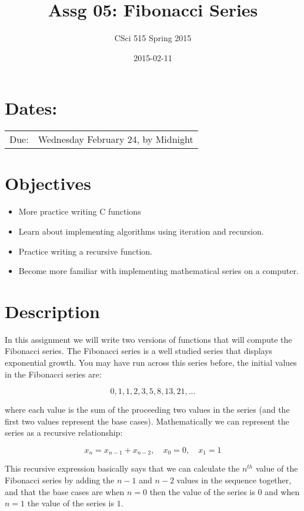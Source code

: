 \documentclass[11pt]{article}
\title{Assg 05: Fibonacci Series}
\author{CSci 515 Spring 2015}
\date{2015-02-11}
\begin{document}
\maketitle


\section*{Dates:}
\label{sec-1}


\begin{center}
\begin{tabular}{ll}
 Due:  &  Wednesday February 24, by Midnight  \\
\end{tabular}
\end{center}
\section*{Objectives}
\label{sec-2}

\begin{itemize}
\item More practice writing C functions
\item Learn about implementing algorithms using iteration and recursion.
\item Practice writing a recursive function.
\item Become more familiar with implementing mathematical series on a computer.
\end{itemize}
\section*{Description}
\label{sec-3}

In this assignment we will write two versions of functions that will
compute the Fibonacci series.  The Fibonacci series is a well studied
series that displays exponential growth.  You may have run across this
series before, the initial values in the Fibonacci series are:

$$
0, 1, 1, 2, 3, 5, 8, 13, 21, ...
$$

where each value is the sum of the proceeding two values in the series
(and the first two values represent the base cases).  Mathematically
we can represent the series as a recursive relationship:

$$
x_n = x_{n-1} + x_{n-2}, \quad x_0 = 0, \quad x_1 = 1
$$

This recursive expression basically says that we can calculate the
$n^{th}$ value of the Fibonacci series by adding the $n-1$ and $n-2$
values in the sequence together, and that the base cases are when $n=0$
then the value of the series is $0$ and when $n=1$ the value of the
series is $1$.
\end{document}
